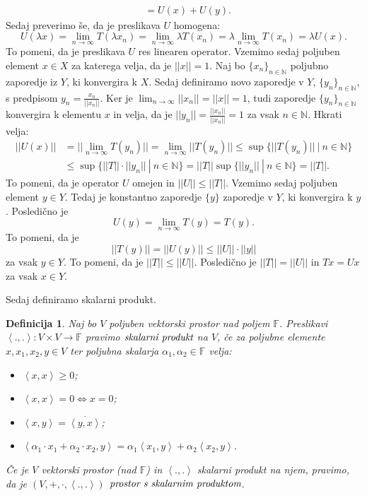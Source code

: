 \documentclass[12pt,a4paper,oneside,fleqn,openany]{book}
\newtheorem{definicija}[izrek]{Definicija}
\newcommand{\eopf}{\raisebox{0.8ex}{\framebox{}}} %
\newenvironment{dokaz}%
{\noindent{\bf Dokaz.}\ }%
{\hfill\eopf\par\bigskip}%
\newcommand{\F}{\mathbb{F}}
\newcommand{\N}{\mathbb{N}}
\newcommand{\abs}[1]{\ensuremath{\lvert #1 \rvert}}
\newcommand{\norm}[1]{\abs{\abs{#1}}}
\newcommand{\pojem}[1]{\ensuremath{\emph{#1}}}
\newcommand{\Sp}[2]{\ensuremath{\left<#1, #2\right>}}
\newcommand{\map}[3]{\ensuremath{{#1}:{#2}\rightarrow{#3}}}
\begin{document}
\begin{dokaz}
\begin{enumerate}[a)]
\begin{align*}
			&= U(x) + U(y).
		\end{align*}
		Sedaj preverimo še, da je preslikava $U$ homogena: $$U(\lambda x)= \lim_{n\to \infty}T(\lambda x_n)= \lim_{n\to \infty}\lambda T(x_n)=\lambda\lim_{n\to \infty}T(x_n)=\lambda U(x).$$ To pomeni, da je preslikava $U$ res linearen operator. Vzemimo sedaj poljuben element $x\in X$ za katerega velja, da je $\norm{x} = 1$. Naj bo $\{x_n\}_{n\in\N}$ poljubno zaporedje iz $Y$, ki konvergira k $X$. Sedaj definiramo novo zaporedje v $Y$, $\{y_n\}_{n\in\N}$, s predpisom $y_n = \frac{x_n}{\norm{x_n}}$. Ker je $\lim_{n\to \infty}\norm{x_n} = \norm{x} = 1$, tudi zaporedje $\{y_n\}_{n\in\N}$ konvergira k elementu $x$ in velja, da je $\norm{y_n} = \frac{\norm{x_n}}{\norm{x_n}}=1$ za vsak $n\in\N$. Hkrati velja: \begin{align*}
			\norm{U(x)} &=\norm{\lim_{n\to \infty}T(y_n)} =\lim_{n\to\infty}\norm{T(y_n)}\leq \sup\{\norm{T(y_n)}~|~n\in\N\} \\
			&\leq \sup\{\norm{T}\cdot\norm{y_n}~|~n\in\N\} = \norm{T}\sup\{\norm{y_n}~|~n\in\N\} = \norm{T}.
		\end{align*} To pomeni, da je operator $U$ omejen in $\norm{U}\leq \norm{T}$. Vzemimo sedaj poljuben element $y\in Y$. Tedaj je konstantno zaporedje $\{y\}$ zaporedje v $Y$, ki konvergira k $y$. Posledično je $$U(y) = \lim_{n\to\infty}T(y) = T(y).$$ To pomeni, da je $$\norm{T(y)}=\norm{U(y)}\leq \norm{U}\cdot\norm{y}$$ za vsak $y\in Y$. To pomeni, da je $\norm{T}\leq \norm{U}$. Posledično je $\norm{T} = \norm{U}$ in $Tx = Ux$ za vsak $x\in Y$.
	\end{enumerate}
\end{dokaz}
Sedaj definiramo skalarni produkt.
\begin{definicija}
	\label{def:ScalProd}
	Naj bo $V$ poljuben vektorski prostor nad poljem $\F$. Preslikavi $\map{\Sp{.}{.}}{V\times V}{\F}$ pravimo \pojem{skalarni produkt} na $V$, če za poljubne elemente $x, x_1, x_2, y\in V$ ter poljubna skalarja $\alpha_1, \alpha_2\in \F$ velja: \begin{itemize}
		\item $\Sp{x}{x} \geq 0$;
		\item $\Sp{x}{x} = 0 \iff x = 0$;
		\item $\Sp{x}{y} = \overline{\Sp{y}{x}}$;
		\item $\Sp{\alpha_1\cdot x_1 + \alpha_2\cdot x_2}{y} = \alpha_1\Sp{x_1}{y} +\alpha_2\Sp{x_2}{y}$.
	\end{itemize}
	Če je $V$ vektorski prostor (nad $\F$) in $\Sp{.}{.}$ skalarni produkt na njem, pravimo, da je $(V, +, \cdot, \Sp{.}{.})$ \pojem{prostor s skalarnim produktom}.
\end{definicija}
\end{document}
